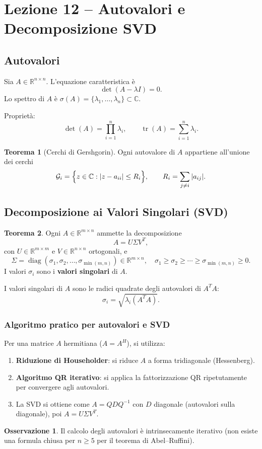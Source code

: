 \documentclass[12pt,a4paper]{article}
\theoremstyle{definition}
\newtheorem{teorema}{Teorema}[section]
\newtheorem{osservazione}{Osservazione}[section]
\begin{document}
\section{Lezione 12 -- Autovalori e Decomposizione SVD}

\subsection{Autovalori}

Sia $A \in \mathbb{R}^{n \times n}$. L'equazione caratteristica è
\[
  \det(A - \lambda I) = 0.
\]
Lo spettro di $A$ è $\sigma(A) = \{\lambda_1, \ldots, \lambda_n\} \subset \mathbb{C}$.

Proprietà:
\[
  \det(A) = \prod_{i=1}^n \lambda_i, \qquad
  \operatorname{tr}(A) = \sum_{i=1}^n \lambda_i.
\]

\begin{teorema}[Cerchi di Gershgorin]
Ogni autovalore di $A$ appartiene all'unione dei cerchi
\[
  \mathcal{G}_i = \Bigl\{z \in \mathbb{C} : |z - a_{ii}| \leq R_i\Bigr\}, \qquad
  R_i = \sum_{j \neq i} |a_{ij}|.
\]
\end{teorema}

\subsection{Decomposizione ai Valori Singolari (SVD)}

\begin{teorema}
Ogni $A \in \mathbb{R}^{m \times n}$ ammette la decomposizione
\[
  A = U \Sigma V^T,
\]
con $U \in \mathbb{R}^{m \times m}$ e $V \in \mathbb{R}^{n \times n}$ ortogonali, e
\[
  \Sigma = \operatorname{diag}(\sigma_1, \sigma_2, \ldots, \sigma_{\min(m,n)}) \in \mathbb{R}^{m \times n},
  \quad \sigma_1 \geq \sigma_2 \geq \cdots \geq \sigma_{\min(m,n)} \geq 0.
\]
I valori $\sigma_i$ sono i \textbf{valori singolari} di $A$.
\end{teorema}

I valori singolari di $A$ sono le radici quadrate degli autovalori di $A^T A$:
\[
  \sigma_i = \sqrt{\lambda_i(A^T A)}.
\]

\subsubsection{Algoritmo pratico per autovalori e SVD}

Per una matrice $A$ hermitiana ($A = A^H$), si utilizza:
\begin{enumerate}
  \item \textbf{Riduzione di Householder}: si riduce $A$ a forma tridiagonale (Hessenberg).
  \item \textbf{Algoritmo QR iterativo}: si applica la fattorizzazione QR ripetutamente per convergere agli autovalori.
  \item La SVD si ottiene come $A = Q D Q^{-1}$ con $D$ diagonale (autovalori sulla diagonale), poi $A = U\Sigma V^T$.
\end{enumerate}

\begin{osservazione}
Il calcolo degli autovalori è intrinsecamente iterativo (non esiste una formula chiusa per $n \geq 5$ per il teorema di Abel--Ruffini).
\end{osservazione}
\end{document}
